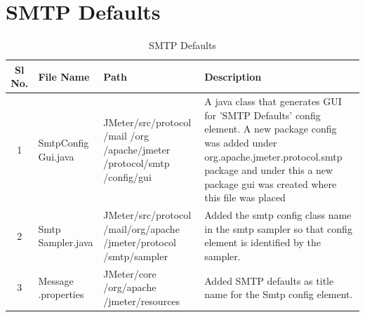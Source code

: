 \documentclass[12pt]{book}
\begin{document}
 \section{SMTP Defaults}
 
  \begin{table}[h]
  \begin{center}
   \begin{tabular}{|c|p{3cm}|p{4cm}|p{6cm}|} 
   \hline
   \textbf{Sl No.} & \textbf{File Name} & \textbf{Path} & \textbf{Description}\\
   \hline
   1 & SmtpConfig Gui.java & JMeter/src/protocol /mail /org /apache/jmeter /protocol/smtp /config/gui & A java class that generates GUI for 'SMTP Defaults' config element. A new package config was added under org.apache.jmeter.protocol.smtp package and under this a new package gui was created where this file was placed\\
   \hline
   2 & Smtp Sampler.java & JMeter/src/protocol /mail/org/apache /jmeter/protocol /smtp/sampler & Added the smtp config class name in the smtp sampler so that config element is identified by the sampler.\\
   \hline
   3 & Message .properties & JMeter/core /org/apache /jmeter/resources & Added SMTP defaults as title name for the Smtp config element.\\
   \hline
   \end{tabular}
   \caption{SMTP Defaults}
  \end{center}
 \end{table}
 
\end{document}
